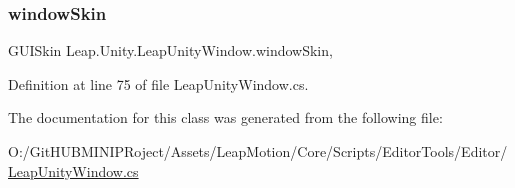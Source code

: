 \subsubsection{\texorpdfstring{windowSkin}{windowSkin}}
{\footnotesize\ttfamily G\+U\+I\+Skin Leap.\+Unity.\+Leap\+Unity\+Window.\+window\+Skin\hspace{0.3cm}{\ttfamily [static]}, {\ttfamily [get]}}



Definition at line 75 of file Leap\+Unity\+Window.\+cs.



The documentation for this class was generated from the following file\+:\begin{DoxyCompactItemize}
\item 
O\+:/\+Git\+H\+U\+B\+M\+I\+N\+I\+P\+Roject/\+Assets/\+Leap\+Motion/\+Core/\+Scripts/\+Editor\+Tools/\+Editor/\mbox{\hyperlink{_leap_unity_window_8cs}{Leap\+Unity\+Window.\+cs}}\end{DoxyCompactItemize}
